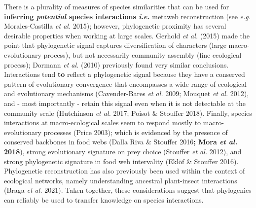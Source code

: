 \documentclass[11pt]{article}
\makeatletter
\def\maxwidth{\ifdim\Gin@nat@width>\linewidth\linewidth
\else\Gin@nat@width\fi}
\let\Oldincludegraphics\includegraphics
\renewcommand{\includegraphics}[1]{\Oldincludegraphics[width=\maxwidth]{#1}}
\providecommand{\DIFaddtex}[1]{{\bf #1}} %
\providecommand{\DIFaddbegin}{\protect\color{blue}} %
\providecommand{\DIFaddend}{\protect\color{black}} %
\providecommand{\DIFdelend}{\protect\color{black}} %
\providecommand{\DIFadd}[1]{\texorpdfstring{\DIFaddtex{#1}}{#1}} %
\newcommand{\DIFaddincludegraphics}[2][]{{\color{blue}\fbox{\DIFOincludegraphics[#1]{#2}}}} %
\DeclareRobustCommand{\DIFaddbegin}{\DIFOaddbegin \let\includegraphics\DIFaddincludegraphics} %
\DeclareRobustCommand{\DIFaddend}{\DIFOaddend \let\includegraphics\DIFOincludegraphics} %
\DeclareRobustCommand{\DIFdelend}{\DIFOaddend \let\includegraphics\DIFOincludegraphics} %
\makeatother
\begin{document}
\DIFdelend There is a plurality of
measures of species similarities that can be used for \DIFaddbegin \DIFadd{inferring
\emph{potential} species interactions \emph{i.e.} }\DIFaddend metaweb reconstruction
(see \emph{e.g.} Morales-Castilla \emph{et al.} 2015); however,
phylogenetic proximity has several desirable properties when working at
large scales. Gerhold \emph{et al.} (2015) made the point that
phylogenetic signal captures diversification of characters (large
macro-evolutionary process), but not necessarily community assembly
(fine ecological process); Dormann \emph{et al.} (2010) previously found
very similar conclusions. Interactions tend \DIFaddbegin \DIFadd{to }\DIFaddend reflect a phylogenetic
signal because they have a conserved pattern of evolutionary convergence
that encompasses a wide range of ecological and evolutionary mechanisms
(Cavender-Bares \emph{et al.} 2009; Mouquet \emph{et al.} 2012), and -
most importantly - retain this signal even when it is not detectable at
the community scale (Hutchinson \emph{et al.} 2017; Poisot \& Stouffer
2018). Finally, species interactions at macro-ecological scales seem to
respond mostly to macro-evolutionary processes (Price 2003); which is
evidenced by the presence of conserved backbones in food webs (Dalla
Riva \& Stouffer 2016\DIFaddbegin \DIFadd{; Mora \emph{et al.} 2018}\DIFaddend ), strong evolutionary
signature on prey choice (Stouffer \emph{et al.} 2012), and strong
phylogenetic signature in food web intervality (Eklöf \& Stouffer 2016).
Phylogenetic reconstruction has also previously been used within the
context of ecological networks, namely understanding ancestral
plant-insect interactions (Braga \emph{et al.} 2021). Taken together,
these considerations suggest that phylogenies can reliably be used to
transfer knowledge on species interactions.
\end{document}
